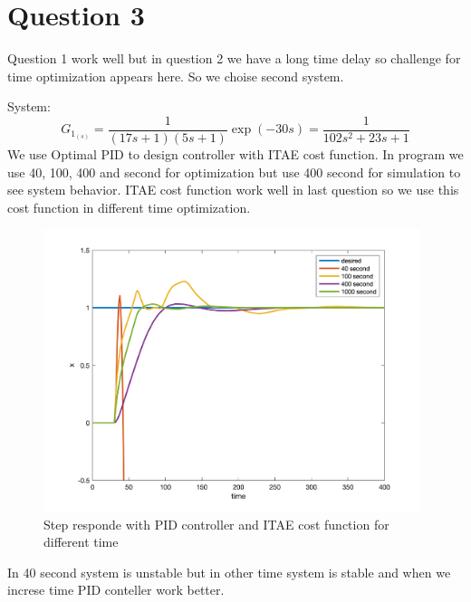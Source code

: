 \section{Question 3}
Question 1 work well but in question 2 we have a long time delay so challenge for time optimization appears here. So we choise second system.


System:
$$
G_{1_{(s)}} = \dfrac{1}{(17s+1)(5s+1)}\exp(-30s) = \dfrac{1}{102s^2+23s+1}
$$
We use Optimal PID to design controller with ITAE cost function. In program we use 40, 100, 400 and second for optimization but use 400 second for simulation to see system behavior. ITAE cost function work well in last question so we use this cost function in different time optimization.
\begin{figure}[H]
    \caption{Step responde with PID controller and ITAE cost function for different time}
    \centering
    \includegraphics[width=11cm]{../Figure/Q3/ITAE.png}
\end{figure}
In 40 second system is unstable but in other time system is stable and when we increse time PID conteller work better.